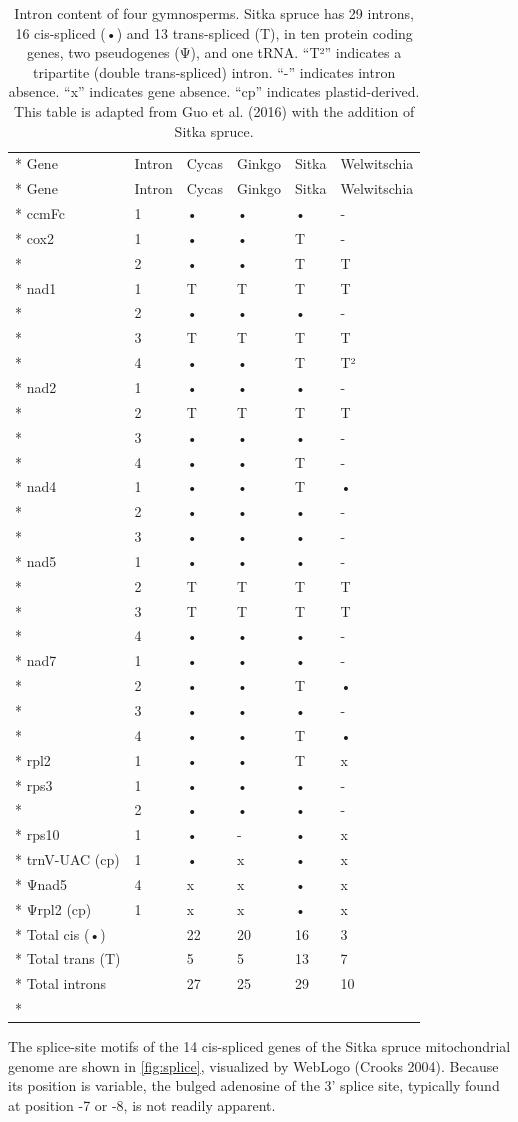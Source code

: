 \documentclass[
  12pt,
  oneside,
  openany]{book}
\begin{document}
\hypertarget{tbl:introns}{}
\begin{singlespace}
\small
\begin{longtable}[]{@{}llllll@{}}
\caption[Intron content of four gymnosperms.]{\label{tbl:introns}Intron content of four gymnosperms. Sitka spruce has 29 introns, 16 cis-spliced (•) and 13 trans-spliced (T), in ten protein coding genes, two pseudogenes (Ψ), and one tRNA. ``T²'' indicates a tripartite (double trans-spliced) intron. ``-'' indicates intron absence. ``x'' indicates gene absence. ``cp'' indicates plastid-derived. This table is adapted from Guo et al. (2016) with the addition of Sitka spruce.}\tabularnewline*
\toprule
Gene & Intron & Cycas & Ginkgo & Sitka & Welwitschia\tabularnewline*
\midrule
\endfirsthead
\toprule
Gene & Intron & Cycas & Ginkgo & Sitka & Welwitschia\tabularnewline*
\midrule
\endhead
ccmFc & 1 & • & • & • & -\tabularnewline*
cox2 & 1 & • & • & T & -\tabularnewline*
& 2 & • & • & T & T\tabularnewline*
nad1 & 1 & T & T & T & T\tabularnewline*
& 2 & • & • & • & -\tabularnewline*
& 3 & T & T & T & T\tabularnewline*
& 4 & • & • & T & T²\tabularnewline*
nad2 & 1 & • & • & • & -\tabularnewline*
& 2 & T & T & T & T\tabularnewline*
& 3 & • & • & • & -\tabularnewline*
& 4 & • & • & T & -\tabularnewline*
nad4 & 1 & • & • & T & •\tabularnewline*
& 2 & • & • & • & -\tabularnewline*
& 3 & • & • & • & -\tabularnewline*
nad5 & 1 & • & • & • & -\tabularnewline*
& 2 & T & T & T & T\tabularnewline*
& 3 & T & T & T & T\tabularnewline*
& 4 & • & • & • & -\tabularnewline*
nad7 & 1 & • & • & • & -\tabularnewline*
& 2 & • & • & T & •\tabularnewline*
& 3 & • & • & • & -\tabularnewline*
& 4 & • & • & T & •\tabularnewline*
rpl2 & 1 & • & • & T & x\tabularnewline*
rps3 & 1 & • & • & • & -\tabularnewline*
& 2 & • & • & • & -\tabularnewline*
rps10 & 1 & • & - & • & x\tabularnewline*
trnV-UAC (cp) & 1 & • & x & • & x\tabularnewline*
Ψnad5 & 4 & x & x & • & x\tabularnewline*
Ψrpl2 (cp) & 1 & x & x & • & x\tabularnewline*
Total cis (•) & & 22 & 20 & 16 & 3\tabularnewline*
Total trans (T) & & 5 & 5 & 13 & 7\tabularnewline*
Total introns & & 27 & 25 & 29 & 10\tabularnewline*
\bottomrule
\end{longtable}
\end{singlespace}

The splice-site motifs of the 14 cis-spliced genes of the Sitka spruce mitochondrial genome are shown in \cref{fig:splice}, visualized by WebLogo (Crooks 2004). Because its position is variable, the bulged adenosine of the 3' splice site, typically found at position -7 or -8, is not readily apparent.
\end{document}

